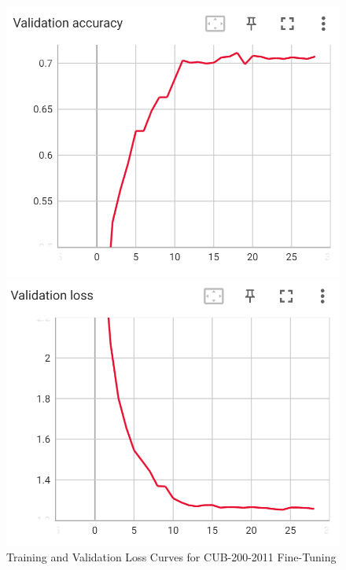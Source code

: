 \documentclass[UTF8]{ctexart}
\begin{document}
\begin{figure}[h]
    \vspace{0.5cm} %

    \begin{minipage}{0.45\textwidth}
        \centering
        \includegraphics[width=\textwidth]{figs/TensorBoard/CUB_ft/ft_val_acc.png}
    \end{minipage}
    \hfill
    \begin{minipage}{0.45\textwidth}
        \centering
        \includegraphics[width=\textwidth]{figs/TensorBoard/CUB_ft/ft_val_loss.png}
    \end{minipage}
    \caption{Training and Validation Loss Curves for CUB-200-2011 Fine-Tuning}
    \label{fig:cubloss}
\end{figure}
\end{document}
